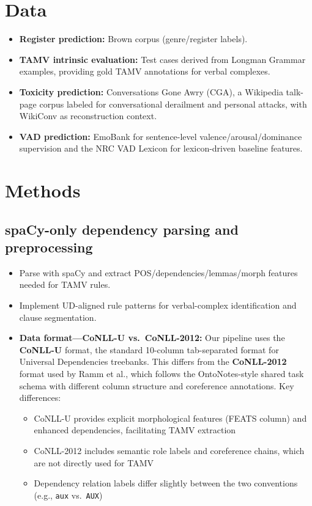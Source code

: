 \documentclass[11pt]{article}
\begin{document}
\section{Data}
\begin{itemize}
  \item \textbf{Register prediction:} Brown corpus (genre/register labels). \citep{19684/682R15.00.}
  \item \textbf{TAMV intrinsic evaluation:} Test cases derived from Longman Grammar examples, providing gold TAMV annotations for verbal complexes. \citep{Biber20101999LongmanEnglish,Ramm2017AnnotatingGerman}
  \item \textbf{Toxicity prediction:} Conversations Gone Awry (CGA), a Wikipedia talk-page corpus labeled for conversational derailment and personal attacks, with WikiConv as reconstruction context. \citep{Zhang2018ConversationsFailure,Hua2018WikiConv:Community}
  \item \textbf{VAD prediction:} EmoBank for sentence-level valence/arousal/dominance supervision and the NRC VAD Lexicon for lexicon-driven baseline features. \citep{Buechel2017EmoBank:Analysis,Mohammad2018ObtainingWords}
\end{itemize}

\section{Methods}
\subsection{spaCy-only dependency parsing and preprocessing}
\begin{itemize}
  \item Parse with spaCy and extract POS/dependencies/lemmas/morph features needed for TAMV rules. \citep{Vasiliev2020NaturalIntroduction,Nivre2010DependencyParsing,Okhapkin2021ConstructingLibraries}
  \item Implement UD-aligned rule patterns for verbal-complex identification and clause segmentation. \citep{Ramm2017AnnotatingGerman,DonickeClause-LevelGerman}
  \item \textbf{Data format---CoNLL-U vs.\ CoNLL-2012:} Our pipeline uses the \textbf{CoNLL-U} format, the standard 10-column tab-separated format for Universal Dependencies treebanks. \citep{Nivre2020UniversalCollection} This differs from the \textbf{CoNLL-2012} format used by Ramm et al., which follows the OntoNotes-style shared task schema with different column structure and coreference annotations. Key differences:
    \begin{itemize}
      \item CoNLL-U provides explicit morphological features (FEATS column) and enhanced dependencies, facilitating TAMV extraction
      \item CoNLL-2012 includes semantic role labels and coreference chains, which are not directly used for TAMV
      \item Dependency relation labels differ slightly between the two conventions (e.g., \texttt{aux} vs.\ \texttt{AUX})
    \end{itemize}
\end{itemize}
\end{document}
